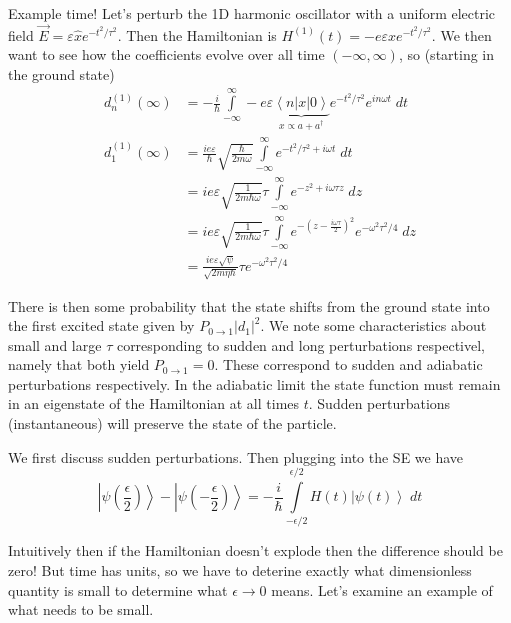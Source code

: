 \documentclass[10pt]{report}
\newcommand{\bra}[1]{\left<#1\right|}
\newcommand{\ket}[1]{\left|#1\right>}
\newcommand{\abs}[1]{\left|#1\right|}
\begin{document}
Example time! Let's perturb the 1D harmonic oscillator with a uniform electric field $\vec{E} = \varepsilon \hat{x}e^{-t^2/\tau^2}$. Then the Hamiltonian is $H^{(1)}(t) = -e\varepsilon xe^{-t^2/\tau^2}$. We then want to see how the coefficients evolve over all time $(-\infty,\infty)$, so (starting in the ground state)
\begin{align}
    d_n^{(1)}(\infty) &= -\frac{i}{\hbar}\displaystyle\int\limits_{-\infty}^{\infty}-e\varepsilon\underbrace{\bra{n}x\ket{0}}_{x \propto a+a^\dagger}e^{-t^2/\tau^2}e^{in\omega t}\;dt\\
    d_1^{(1)}(\infty)&= \frac{ie\varepsilon}{\hbar}\sqrt{\frac{\hbar}{2m\omega}}\displaystyle\int\limits_{-\infty}^{\infty}e^{-t^2/\tau^2 + i\omega t}\;dt\\
    &= ie\varepsilon\sqrt{\frac{1}{2m\hbar\omega}}\tau\displaystyle\int\limits_{-\infty}^{\infty}e^{-z^2+i\omega\tau z}\;dz\\
    &= ie\varepsilon\sqrt{\frac{1}{2m\hbar\omega}}\tau\displaystyle\int\limits_{-\infty}^{\infty}e^{-\left(z-\frac{i\omega\tau}{2}\right)^2}e^{-\omega^2\tau^2/4}\;dz\\
    &= \frac{ie\varepsilon\sqrt{\psi}}{\sqrt{2m\eta\hbar}}\tau e^{-\omega^2\tau^2/4}
    \label{1.24.ex}
\end{align}

There is then some probability that the state shifts from the ground state into the first excited state given by $P_{0\to1}\abs{d_1}^2$. We note some characteristics about small and large $\tau$ corresponding to sudden and long perturbations respectivel, namely that both yield $P_{0\to1} = 0$. These correspond to sudden and adiabatic perturbations respectively. In the adiabatic limit the state function must remain in an eigenstate of the Hamiltonian at all times $t$. Sudden perturbations (instantaneous) will preserve the state of the particle. 

We first discuss sudden perturbations. Then plugging into the SE we have
\begin{equation}
    \ket{\psi\left( \frac{\epsilon}{2} \right)} - \ket{\psi\left( -\frac{\epsilon}{2} \right)} = -\frac{i}{\hbar}\displaystyle\int\limits_{-\epsilon/2}^{\epsilon/2}H(t)\ket{\psi(t)}\;dt
    \label{1.24.sudden}
\end{equation}

Intuitively then if the Hamiltonian doesn't explode then the difference should be zero! But time has units, so we have to deterine exactly what dimensionless quantity is small to determine what $\epsilon \to 0$ means. Let's examine an example of what needs to be small. 
\end{document}
